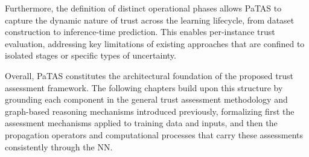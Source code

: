 Furthermore, the definition of distinct operational phases allows \ac{PaTAS} to capture the dynamic nature of trust across the learning lifecycle, from dataset construction to inference-time prediction. This enables per-instance trust evaluation, addressing key limitations of existing approaches that are confined to isolated stages or specific types of uncertainty.

Overall, \ac{PaTAS} constitutes the architectural foundation of the proposed trust assessment framework. The following chapters build upon this structure by grounding each component in the general trust assessment methodology and graph-based reasoning mechanisms introduced previously, formalizing first the assessment mechanisms applied to training data and inputs, and then the propagation operators and computational processes that carry these assessments consistently through the \ac{NN}.